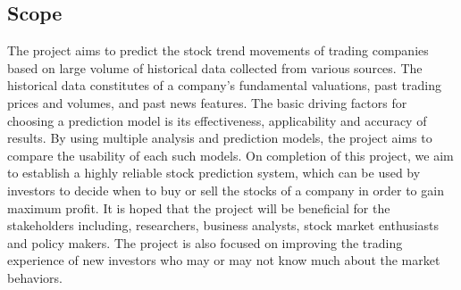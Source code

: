 \subsection{Scope}
The project aims to predict the stock trend movements of trading companies based on large volume of historical data collected from various sources. The historical data constitutes of a company's fundamental valuations, past trading prices and volumes, and past news features. The basic driving factors for choosing a prediction model is its effectiveness, applicability and accuracy of results. By using multiple analysis and prediction models, the project aims to compare the usability of each such models. On completion of this project, we aim to establish a highly reliable stock prediction system, which can be used by investors to decide when to buy or sell the stocks of a company in order to gain maximum profit. It is hoped that the project will be beneficial for the stakeholders including, researchers, business analysts, stock market enthusiasts and policy makers. The project is also focused on improving the trading experience of new investors who may or may not know much about the market behaviors.
